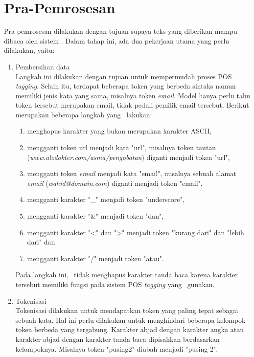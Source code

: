 \section{Pra-Pemrosesan}
Pra-pemrosesan dilakukan dengan tujuan supaya teks yang diberikan mampu dibaca oleh sistem \mer. Dalam tahap ini, ada dua pekerjaan utama yang perlu dilakukan, yaitu:
\begin{enumerate}
	\item Pembersihan data\\
	Langkah ini dilakukan dengan tujuan untuk mempermudah proses POS \textit{tagging}. Selain itu, terdapat beberapa token yang berbeda sintaks namun memiliki jenis kata yang sama, misalnya token \textit{email}. Model hanya perlu tahu token tersebut merupakan email, tidak peduli pemilik email tersebut. Berikut merupakan beberapa langkah yang \saya~lakukan:
	
	\begin{enumerate}
		\item menghapus karakter yang bukan merupakan karakter ASCII,
		\item mengganti token url menjadi kata "url", misalnya token tautan (\textit{www.alodokter.com/asma/pengobatan}) diganti menjadi token "url",
		\item mengganti token \textit{email} menjadi kata "email", misalnya sebuah alamat \textit{email} (\textit{wahid@domain.com}) diganti menjadi token "email",
		\item mengganti karakter "\_" menjadi token "underscore",
		\item mengganti karakter "\&" menjadi token "dan",
		\item mengganti karakter "\textless" dan "\textgreater" menjadi token "kurang dari" dan "lebih dari" dan
		\item mengganti karakter "/" menjadi token "atau".
	\end{enumerate}
	Pada langkah ini, \saya~tidak menghapus karakter tanda baca karena karakter tersebut memiliki fungsi pada sistem POS \textit{tagging} yang \saya~gunakan.
	
	\item Tokenisasi\\
	Tokenisasi dilakukan untuk mendapatkan token yang paling tepat sebagai sebuah kata. Hal ini perlu dilakukan untuk menghindari beberapa kelompok token berbeda yang tergabung. Karakter abjad dengan karakter angka atau karakter abjad dengan karakter tanda baca dipisahkan berdasarkan kelompoknya. Misalnya token "pusing2" diubah menjadi "pusing 2".
	

\end{enumerate}
